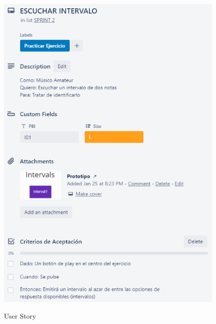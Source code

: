 \documentclass[12pt,twoside,titlepage]{report}
\begin{document}
\begin{figure}[H]
    \centering
    \includegraphics[scale=1.3]{Scrum/User Stories/Intervalos}
    \label{fig:Intervalos}
    \caption{User Story}
\end{figure}
\end{document}
